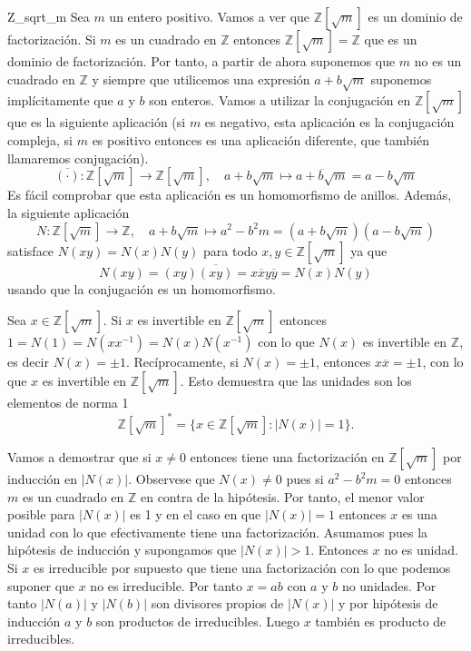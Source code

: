 \begin{example}{}{Z_sqrt_m}
Sea \(m\) un entero positivo. Vamos a ver que \(\mathbb{Z}[\sqrt{m}]\) es un dominio de factorización. Si \(m\) es un cuadrado en \(\mathbb{Z}\) entonces \(\mathbb{Z}[\sqrt{m}] = \mathbb{Z}\) que es un dominio de factorización. Por tanto, a partir de ahora suponemos que \(m\) no es un cuadrado en \(\mathbb{Z}\) y siempre que utilicemos una expresión \(a + b\sqrt{m}\) suponemos implícitamente que \(a\) y \(b\) son enteros. Vamos a utilizar la conjugación en \(\mathbb{Z}[\sqrt{m}]\) que es la siguiente aplicación (si \(m\) es negativo, esta aplicación es la conjugación compleja, si \(m\) es positivo entonces es una aplicación diferente, que también llamaremos conjugación).
\[
\overline{(\cdot)}: \mathbb{Z}[\sqrt{m}] \to \mathbb{Z}[\sqrt{m}], \quad a + b\sqrt{m} \mapsto \overline{a + b\sqrt{m}} = a - b\sqrt{m}
\]
Es fácil comprobar que esta aplicación es un homomorfismo de anillos.  Además, la siguiente aplicación
\[
N: \mathbb{Z}[\sqrt{m}] \to \mathbb{Z}, \quad a + b\sqrt{m} \mapsto a^2 - b^2 m = (a + b\sqrt{m})(a - b\sqrt{m})
\]
satisface \(N(xy) = N(x)N(y)\) para todo \(x, y \in \mathbb{Z}[\sqrt{m}]\) ya que 
\[
N(xy) = (xy)\overline{(xy)} = x \overline{x} y \overline{y} = N(x)N(y)
\]
usando que la conjugación es un homomorfismo.

Sea \(x \in \mathbb{Z}[\sqrt{m}]\). Si \(x\) es invertible en \(\mathbb{Z}[\sqrt{m}]\) entonces \(1 = N(1) = N(xx^{-1}) = N(x)N(x^{-1})\) con lo que \(N(x)\) es invertible en \(\mathbb{Z}\), es decir \(N(x) = \pm 1\). Recíprocamente, si \(N(x) = \pm 1\), entonces \(x\overline{x} = \pm 1\), con lo que \(x\) es invertible en \(\mathbb{Z}[\sqrt{m}]\). Esto demuestra que las unidades son los elementos de norma 1
\[
\mathbb{Z}[\sqrt{m}]^* = \{x \in \mathbb{Z}[\sqrt{m}] : |N(x)| = 1\}.
\]

Vamos a demostrar que si \(x \neq 0\) entonces tiene una factorización en \(\mathbb{Z}[\sqrt{m}]\) por inducción en \(|N(x)|\). Observese que \(N(x) \neq 0\) pues si \(a^2 - b^2 m = 0\) entonces \(m\) es un cuadrado en \(\mathbb{Z}\) en contra de la hipótesis. Por tanto, el menor valor posible para \(|N(x)|\) es 1 y en el caso en que \(|N(x)| = 1\) entonces \(x\) es una unidad con lo que efectivamente tiene una factorización. Asumamos pues la hipótesis de inducción y supongamos que \(|N(x)| > 1\). Entonces \(x\) no es unidad. Si \(x\) es irreducible por supuesto que tiene una factorización con lo que podemos suponer que \(x\) no es irreducible. Por tanto \(x = ab\) con \(a\) y \(b\) no unidades. Por tanto \(|N(a)|\) y \(|N(b)|\) son divisores propios de \(|N(x)|\) y por hipótesis de inducción \(a\) y \(b\) son productos de irreducibles. Luego \(x\) también es producto de irreducibles.
\end{example}

